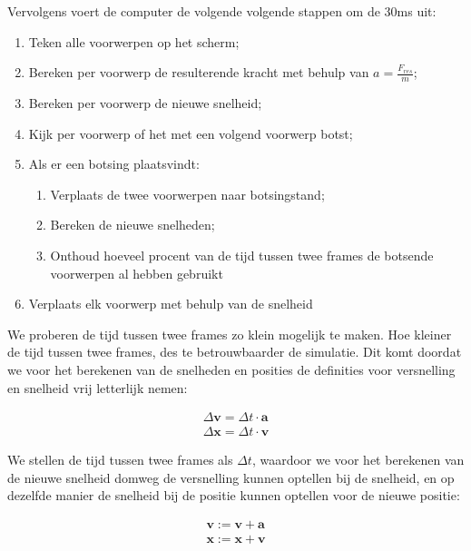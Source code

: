 \documentclass[12pt,a4paper]{article}
\begin{document}
	Vervolgens voert de computer de volgende volgende stappen om de 30ms uit: 
	
	\begin{enumerate}
		\item Teken alle voorwerpen op het scherm;
		\item Bereken per voorwerp de resulterende kracht met behulp van $a = \tfrac{F_{res}}{m}$;
		\item Bereken per voorwerp de nieuwe snelheid;
		\item Kijk per voorwerp of het met een volgend voorwerp botst;
		\item Als er een botsing plaatsvindt:
			\begin{enumerate}
				\item Verplaats de twee voorwerpen naar botsingstand;
				\item Bereken de nieuwe snelheden;
				\item Onthoud hoeveel procent van de tijd tussen twee frames de botsende voorwerpen al hebben gebruikt
			\end{enumerate}
		\item Verplaats elk voorwerp met behulp van de snelheid
	\end{enumerate}
	
	We proberen de tijd tussen twee frames zo klein mogelijk te maken. Hoe kleiner de tijd tussen twee frames, des te betrouwbaarder de simulatie. Dit komt doordat we voor het berekenen van de snelheden en posities de definities voor versnelling en snelheid vrij letterlijk nemen:
	
	\begin{equation}
		\begin{aligned}
			\Delta \mathbf{v} = \Delta t \cdot \mathbf{a} \\
			\Delta \mathbf{x} = \Delta t \cdot \mathbf{v}
		\end{aligned}
	\end{equation}
	
	We stellen de tijd tussen twee frames als $\Delta t$, waardoor we voor het berekenen van de nieuwe snelheid domweg de versnelling kunnen optellen bij de snelheid, en op dezelfde manier de snelheid bij de positie kunnen optellen voor de nieuwe positie:
	
	\begin{equation}
		\begin{aligned}
			\mathbf{v} := \mathbf{v} + \mathbf{a} \\
			\mathbf{x} := \mathbf{x} + \mathbf{v}
		\end{aligned}
	\end{equation}
	
\end{document}
